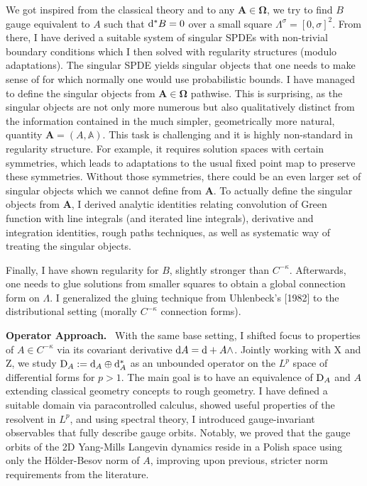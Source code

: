 \documentclass[./Research_statement.tex]{subfiles}
\newcommand{\bfOmega}{\boldsymbol{\Omega}}
\newcommand{\bA}{\mathbb A}
\newcommand{\bfA}{\mathbf{A}}
\begin{document}
We got inspired from the classical theory and to any $\bfA\in\bfOmega$,  we try to find $B$ gauge equivalent to $A$ such that $\mathrm{d}^*B=0$ over a small square $\Lambda^\sigma=[0,\sigma]^2$. From there, I have derived a suitable system of singular SPDEs with non-trivial boundary conditions which I then solved with regularity structures (modulo adaptations). 
%
%
The singular SPDE yields singular objects 
that one needs to make sense of for which normally one would use probabilistic bounds. I have managed to define the singular objects from $\bfA\in\bfOmega$ pathwise. This is surprising, as the singular objects are not only more numerous but also qualitatively distinct from the information contained in the much simpler, geometrically more natural, quantity $\bfA=(A,\bA)$.  This task is challenging and it is highly non-standard in regularity structure. For example, it requires solution spaces  with certain symmetries, which leads to adaptations to the usual fixed point map to preserve these symmetries. Without those symmetries, there could be an even larger set of singular objects which we cannot define from $\bfA$. 
%
To actually define the singular objects from $\bfA$, I derived analytic identities relating convolution of Green function with line integrals (and iterated line integrals), derivative and integration identities, rough paths techniques, as well as systematic way of treating the singular objects. 

Finally, I have shown regularity for $B$, slightly stronger than $C^{-\kappa}$. Afterwards, one needs to glue solutions from smaller squares to obtain a global connection form on $\Lambda$. I generalized the gluing technique from Uhlenbeck's [1982] to the distributional setting (morally $C^{-\kappa}$ connection forms). 

\vspace{2pt}

\noindent \textbf{Operator Approach.}\ 
%
With the same base setting, I shifted focus to properties of $A\in C^{-\kappa}$ via its covariant derivative $\mathrm{d} A = \mathrm{d} + A\wedge $. Jointly working with X and Z, we study $\mathrm{D}_A:=\mathrm{d}_A\oplus\mathrm{d}_A^*$ as an unbounded operator on the $L^p$  space of differential forms for $p>1$.  The main goal is to have an equivalence of $\mathrm{D}_A$ and $A$ extending classical geometry concepts to rough geometry. I have defined a suitable domain via paracontrolled calculus, showed useful properties of the resolvent in $L^p$, and using spectral theory, I introduced gauge-invariant observables that fully describe gauge orbits. Notably, we proved that the gauge orbits of the 2D Yang-Mills Langevin dynamics reside in a Polish space using only the H\"older-Besov norm of $A$, improving upon previous, stricter norm requirements from the literature. 
\end{document}
